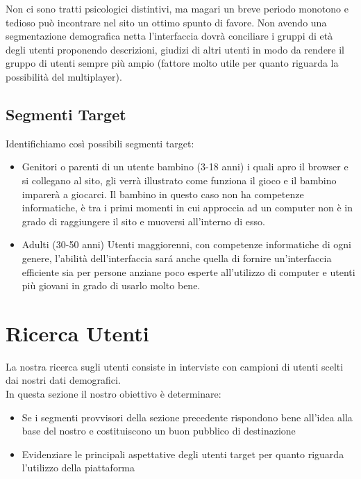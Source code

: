 \documentclass[../Report.tex]{subfiles}
\begin{document}
    Non ci sono tratti psicologici distintivi, ma magari un breve periodo monotono e tedioso può incontrare nel sito un ottimo spunto di favore.
    Non avendo una segmentazione demografica netta l’interfaccia dovrà conciliare i gruppi di età degli utenti proponendo descrizioni, giudizi di altri utenti in modo da rendere il gruppo di utenti sempre più ampio (fattore molto utile per quanto riguarda la possibilità del multiplayer).

    \subsection{Segmenti Target}
    Identifichiamo così possibili segmenti target:
    \begin{itemize}
        \item Genitori o parenti di un utente bambino (3-18 anni) i quali apro il browser e si collegano al sito, gli verrà illustrato come funziona il gioco e il bambino imparerà a giocarci. Il bambino in questo caso non ha competenze informatiche, è tra i primi momenti in cui approccia ad un computer non è in grado di raggiungere il sito e muoversi all’interno di esso.
        \item Adulti (30-50 anni) Utenti maggiorenni, con competenze informatiche di ogni genere, l’abilità dell’interfaccia sará anche quella di fornire un’interfaccia efficiente sia per persone anziane poco esperte all’utilizzo di computer e utenti più giovani in grado di usarlo molto bene.      
    \end{itemize}

    \section{Ricerca Utenti}
    
    La nostra ricerca sugli utenti consiste in interviste con campioni di utenti scelti dai nostri dati demografici.\\
    In questa sezione il nostro obiettivo è determinare:
    \begin{itemize}
        \item Se i segmenti provvisori della sezione precedente rispondono bene all’idea alla base del nostro e costituiscono un buon pubblico di destinazione
        \item Evidenziare le principali aspettative degli utenti target per quanto riguarda l’utilizzo della piattaforma
    \end{itemize}
\end{document}
